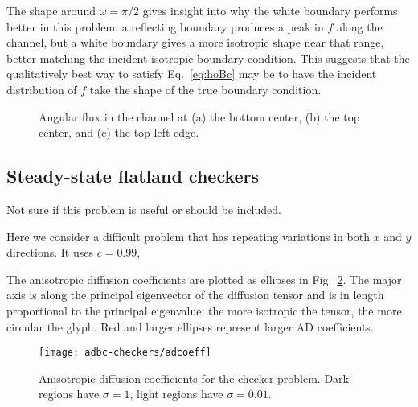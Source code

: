 The shape around $\omega=\pi/2$ gives insight into why the white boundary
performs better in this problem: a reflecting boundary produces a peak in $f$
along the channel, but a white boundary gives a more isotropic shape near that
range, better matching the incident isotropic boundary condition. This suggests
that the qualitatively best way to satisfy Eq.~\eqref{eq:hoBc} may be
to have the incident distribution of $f$ take the shape of the true boundary
condition.


\begin{figure}[htb]
  \centering\small

  \hspace{-.75in}
  \hspace{-.5in}%
  \hspace{-.75in}
  \caption{Angular flux in the channel at (a) the bottom center, (b) the top
  center, and (c) the top left edge.}
  \label{fig:bcReactor}
\end{figure}

\clearpage
\subsection{Steady-state flatland checkers}
Not sure if this problem is useful or should be included.

Here we consider a difficult problem that has repeating variations in both $x$
and $y$ directions. It uses $c=0.99$, 

The anisotropic diffusion coefficients are plotted as ellipses in
Fig.~\ref{fig:bcCheckersAdcoeff}. The major axis is along the principal
eigenvector of the diffusion tensor and is in length proportional to the
principal eigenvalue; the more isotropic the tensor, the more circular the
glyph. Red and larger ellipses represent larger AD coefficients.

\begin{figure}[htb]
  \centering\small
  \texttt{[image: adbc-checkers/adcoeff]}
  \caption[Anisotropic diffusion coefficients for the checker problem.]{
  Anisotropic diffusion coefficients for the checker problem. Dark
  regions have $\sigma=1$, light regions have $\sigma=0.01$.}
  \label{fig:bcCheckersAdcoeff}
\end{figure}

